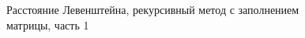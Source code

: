 \documentclass[12pt,a4paper]{report}
\begin{document}
\begin{figure}[h]
\caption{Расстояние Левенштейна, рекурсивный метод с заполнением матрицы, часть 1}
\label{fig:image}
\end{figure}
\end{document}
